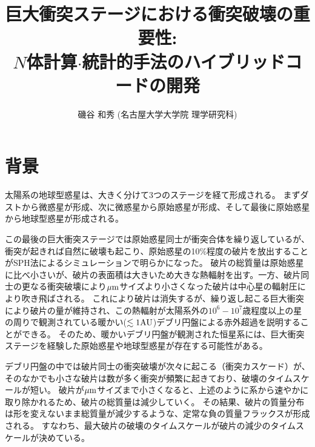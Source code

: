 \documentclass[a4paper,10pt,oneside,twocolumn,notitlepage,final]{jarticle}
\author{磯谷 和秀 (名古屋大学大学院 理学研究科)}
\title{巨大衝突ステージにおける衝突破壊の重要性:\\
$N$体計算$\cdot$統計的手法のハイブリッドコードの開発}
\begin{document}




\section{背景}
太陽系の地球型惑星は、大きく分けて3つのステージを経て形成される。
まずダストから微惑星が形成、次に微惑星から原始惑星が形成、そして最後に原始惑星から地球型惑星が形成される。

この最後の巨大衝突ステージでは原始惑星同士が衝突合体を繰り返しているが、衝突が起きれば自然に破壊も起こり、原始惑星の10\%程度の破片を放出することがSPH法によるシミュレーションで明らかになった\citep{Genda2012}。
破片の総質量は原始惑星に比べ小さいが、破片の表面積は大きいため大きな熱輻射を出す。一方、破片同士の更なる衝突破壊により$\mu {\rm m}$サイズより小さくなった破片は中心星の輻射圧により吹き飛ばされる。
これにより破片は消失するが、繰り返し起こる巨大衝突により破片の量が維持され、この熱輻射が太陽系外の$10^6 - 10^7$歳程度以上の星の周りで観測されている暖かい($\lesssim 1 {\rm AU}$)デブリ円盤による赤外超過を説明することができる\citep{Genda2015}。
そのため、暖かいデブリ円盤が観測された恒星系には、巨大衝突ステージを経験した原始惑星や地球型惑星が存在する可能性がある。

デブリ円盤の中では破片同士の衝突破壊が次々に起こる（衝突カスケード）が、そのなかでも小さな破片は数が多く衝突が頻繁に起きており、破壊のタイムスケールが短い。
破片が$\mu {\rm m}$サイズまで小さくなると、上述のように系から速やかに取り除かれるため、破片の総質量は減少していく。
その結果、破片の質量分布は形を変えないまま総質量が減少するような、定常な負の質量フラックスが形成される\citep[e.g.,][]{Tanaka1996}。
すなわち、最大破片の破壊のタイムスケールが破片の減少のタイムスケールが決めている。
\end{document}
